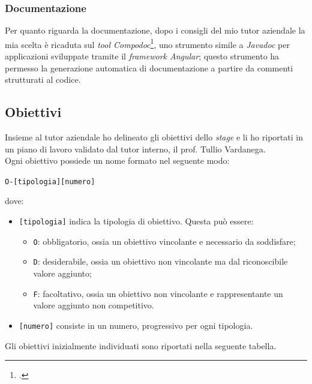 \subsubsection*{Documentazione}
Per quanto riguarda la documentazione, dopo i consigli del mio tutor aziendale la mia scelta è ricaduta sul \textit{tool Compodoc}\footcite{tec:compodoc}, uno strumento simile a \textit{Javadoc} per applicazioni sviluppate tramite il \textit{framework Angular}; questo strumento ha permesso la generazione automatica di documentazione a partire da commenti strutturati al codice.

\subsection{Obiettivi}

Insieme al tutor aziendale ho delineato gli obiettivi dello \textit{stage} e li ho riportati in un piano di lavoro validato dal tutor interno, il prof. Tullio Vardanega. \\
Ogni obiettivo possiede un nome formato nel seguente modo:
\begin{center}
  \centering
  \texttt{O-[tipologia][numero]}
\end{center} dove:
\begin{itemize}
  \item \texttt{[tipologia]} indica la tipologia di obiettivo. Questa può essere:
  \begin{itemize}
    \item \texttt{O}: obbligatorio, ossia un obiettivo vincolante e necessario da soddisfare;
    \item \texttt{D}: desiderabile, ossia un obiettivo non vincolante ma dal riconoscibile valore aggiunto;
    \item \texttt{F}: facoltativo, ossia un obiettivo non vincolante e rappresentante un valore aggiunto non competitivo.
  \end{itemize}
  \item \texttt{[numero]} consiste in un numero, progressivo per ogni tipologia.
\end{itemize}

Gli obiettivi inizialmente individuati sono riportati nella seguente tabella.
\newpage

